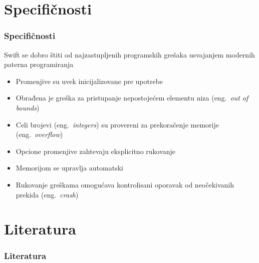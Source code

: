 \documentclass{beamer}
\begin{document}
\section{Specifičnosti}
\begin{frame}
\frametitle{Specifičnosti}

Swift se dobro štiti od najzastupljenih programskih grešaka usvajanjem modernih paterna programiranja \cite{swift_sajt}
\begin{itemize}
\item Promenjive su uvek inicijalizovane pre upotrebe
\item Obrađena je greška za pristupanje nepostojećem elementu niza (eng.~{\em out of bounds})
\item Celi brojevi (eng.~{\em integers}) su provereni za prekoračenje memorije (eng.~{\em overflow})
\item Opcione promenjive zahtevaju eksplicitno rukovanje
\item Memorijom se upravlja automatski
\item Rukovanje greškama omogućava kontrolisani oporavak od neočekivanih prekida (eng.~{\em crash})
\end{itemize}

\end{frame}

\section{Literatura}

\begin{frame}
\frametitle{Literatura}



\end{frame}
\end{document}
